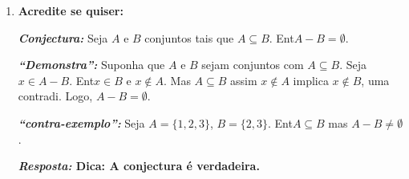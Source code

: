 \begin{enumerate}[{\bf 1.}]
\begin{enumerate}[a)]
\item $(A\subseteq C\ee B\subseteq C)\leftrightarrow A\uni B\subseteq C$.
\item $(A\subseteq C\ee B\subseteq D)\to(A\uni B\subseteq C\uni D)$.
\item $[(A\inter C=A\inter B)\ee(A\uni C=A\uni B)]\to B=C$.
\item $A\subseteq B\leftrightarrow A^C\uni B=\mathbb{U}$.
\item $A-B\subseteq B\leftrightarrow A\subseteq B$.

{\bf{\it Resposta:} Primeiro mostremos que ${\bf A-B\subseteq B\rightarrow A\subseteq B}$. De fato, suponha ${\bf A-B\subseteq B}$ e ${\bf A\not\subseteq B}$, ou seja, ${\bf \exists x\in A}$ tal que ${\bf x\notin B}$, portanto ${\bf x\in A-B}$, como ${\bf A-B\subseteq B}$, ent\ao ${\bf x\in B}$, contradi\caoi. Desejamos agora demonstrar que ${\bf A\subseteq B\rightarrow A-B\subseteq B}$. De fato, seja ${\bf x\in A-B}$, ent\ao ${\bf x\in A}$ e ${\bf x\notin B}$, mas como ${\bf A\subseteq B}$, ent\ao ${\bf x\in B}$, contradi\caoi. Logo, ${\bf A-B=\emptyset\subseteq B}$.}


\item $A\inter B=\mathbb{U}\leftrightarrow A=B=\mathbb{U}$.
\item $A\uni B\neq\emptyset\leftrightarrow A\neq\emptyset \ou B\neq\emptyset $.
\item $\mathbb{P}(A)=\mathbb{P}(B)\to A=B$.

{\bf{\it Resposta:} Se ${\bf A\neq B}$, ent\ao ${\bf \exists x\in A}$ tal que ${\bf x\notin B}$, logo ${\bf \{x\}\in \mathbb{P}(A)}$ e ${\bf \{x\}\notin \mathbb{P}(B)}$, logo ${\bf \mathbb{P}(A)\neq\mathbb{P}(B)}$.}
\end{enumerate}

\item {\bf Acredite se quiser:}  

\noindent \textit{\textbf{Conjectura:}} Seja $A$ e $B$ conjuntos tais que $A\subseteq B$. Ent\ao $A-B=\emptyset$.

\noindent \textit{\textbf{``Demonstra\caoi'':}} Suponha que $A$ e $B$ sejam conjuntos com $A\subseteq B$. Seja $x\in A-B$. Ent\ao $x\in B$ e $x\notin A$. Mas $A\subseteq B$ assim $x\notin A$ implica $x\notin B$, uma contradi\caoi. Logo, $A-B=\emptyset$.

\noindent \textit{\textbf{``contra-exemplo'':}} Seja $A=\{1,2,3\}$, $B=\{2,3\}$. Ent\ao $A\subseteq B$ mas $A-B\neq\emptyset$.

{\bf{\it Resposta:} Dica: A conjectura \'e verdadeira.}


\end{enumerate}

